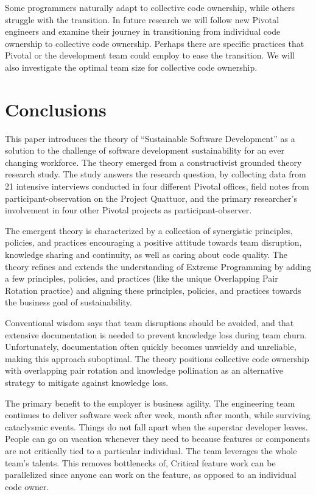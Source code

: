 \begin{table}[]
Some programmers naturally adapt to collective code ownership, while others struggle with the transition. In future research we will follow new Pivotal engineers and examine their journey in transitioning from individual code ownership to collective code ownership. Perhaps there are 
specific practices that Pivotal or the development team could employ to ease the transition. We will also investigate the optimal team size for collective code ownership. 

\section{Conclusions}
This paper introduces the theory of “Sustainable Software Development” as a solution to the challenge of software development sustainability for an ever changing workforce. The theory emerged from a constructivist grounded theory research study. The study answers the research  question,  by collecting data from 21 intensive interviews conducted in four different Pivotal offices, field notes from participant-observation on the Project Quattuor, and the primary researcher's involvement in four other Pivotal projects as participant-observer.

The emergent theory is characterized by a collection of synergistic principles, policies, and practices encouraging a positive attitude towards team disruption, knowledge sharing and continuity, as well as caring about code quality. The theory refines and extends the understanding of Extreme Programming by adding a few principles, policies, and practices (like the unique Overlapping Pair Rotation practice) and aligning these principles, policies, and practices towards the business goal of sustainability.

Conventional wisdom says that team disruptions should be avoided, and that extensive documentation is needed to prevent knowledge loss during team churn. Unfortunately, documentation often quickly becomes unwieldy and unreliable, making this approach suboptimal. The theory positions collective code ownership with overlapping pair rotation and knowledge pollination as an alternative strategy to mitigate against knowledge loss.

The primary benefit to the employer is business agility. The engineering team continues to deliver software week after week, month after month, while surviving cataclysmic events. Things do not fall apart when the superstar developer leaves. People can go on vacation whenever they need to because features or components are not critically tied to a particular individual. The team leverages the whole team's talents. This removes bottlenecks of,  Critical feature work can be parallelized since anyone can work on the feature, as opposed to an individual code owner. 


\end{table}
